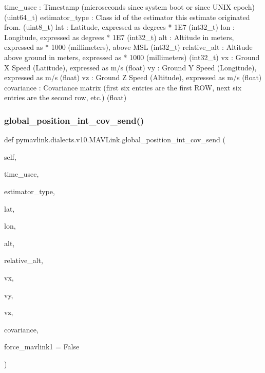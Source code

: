 \begin{DoxyVerb}
\begin{DoxyVerb}
\begin{DoxyVerb}
time_usec                 : Timestamp (microseconds since system boot or since UNIX epoch) (uint64_t)
estimator_type            : Class id of the estimator this estimate originated from. (uint8_t)
lat                       : Latitude, expressed as degrees * 1E7 (int32_t)
lon                       : Longitude, expressed as degrees * 1E7 (int32_t)
alt                       : Altitude in meters, expressed as * 1000 (millimeters), above MSL (int32_t)
relative_alt              : Altitude above ground in meters, expressed as * 1000 (millimeters) (int32_t)
vx                        : Ground X Speed (Latitude), expressed as m/s (float)
vy                        : Ground Y Speed (Longitude), expressed as m/s (float)
vz                        : Ground Z Speed (Altitude), expressed as m/s (float)
covariance                : Covariance matrix (first six entries are the first ROW, next six entries are the second row, etc.) (float)\end{DoxyVerb}
 \mbox{\label{classpymavlink_1_1dialects_1_1v10_1_1MAVLink_acb99b22c9f74ee9f2edd07d09ad39355}} 
\subsubsection{\texorpdfstring{global\+\_\+position\+\_\+int\+\_\+cov\+\_\+send()}{global\_position\_int\_cov\_send()}}
{\footnotesize\ttfamily def pymavlink.\+dialects.\+v10.\+M\+A\+V\+Link.\+global\+\_\+position\+\_\+int\+\_\+cov\+\_\+send (\begin{DoxyParamCaption}\item[{}]{self,  }\item[{}]{time\+\_\+usec,  }\item[{}]{estimator\+\_\+type,  }\item[{}]{lat,  }\item[{}]{lon,  }\item[{}]{alt,  }\item[{}]{relative\+\_\+alt,  }\item[{}]{vx,  }\item[{}]{vy,  }\item[{}]{vz,  }\item[{}]{covariance,  }\item[{}]{force\+\_\+mavlink1 = {\ttfamily False} }\end{DoxyParamCaption})}


\end{DoxyVerb}
\end{DoxyVerb}
